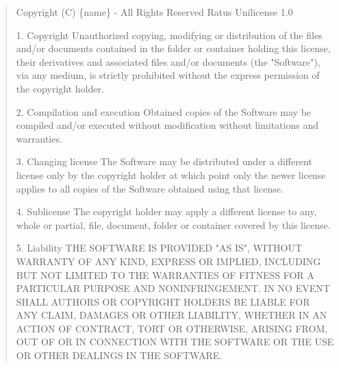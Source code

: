 \documentclass[a4paper,11pt]{article}
\begin{document}
  \begin{quote}
    Copyright (C) \{name\} - All Rights Reserved\newline
    Ratus Unilicense 1.0

    1. Copyright\newline
    Unauthorized copying, modifying or distribution of the files and/or
    documents contained in the folder or container holding this license,
    their derivatives and associated files and/or documents (the "Software"),
    via any medium, is strictly prohibited without the express permission of
    the copyright holder.

    2. Compilation and execution\newline
    Obtained copies of the Software may be compiled and/or executed without
    modification without limitations and warranties.

    3. Changing license\newline
    The Software may be distributed under a different license only by the
    copyright holder at which point only the newer license applies to all
    copies of the Software obtained using that license.

    4. Sublicense\newline
    The copyright holder may apply a different license to any, whole or
    partial, file, document, folder or container covered by this license.

    5. Liability\newline
    THE SOFTWARE IS PROVIDED "AS IS", WITHOUT WARRANTY OF ANY KIND, EXPRESS OR
    IMPLIED, INCLUDING BUT NOT LIMITED TO THE WARRANTIES OF FITNESS FOR A
    PARTICULAR PURPOSE AND NONINFRINGEMENT. IN NO EVENT SHALL AUTHORS OR
    COPYRIGHT HOLDERS BE LIABLE FOR ANY CLAIM, DAMAGES OR OTHER LIABILITY,
    WHETHER IN AN ACTION OF CONTRACT, TORT OR OTHERWISE, ARISING FROM, OUT OF
    OR IN CONNECTION WITH THE SOFTWARE OR THE USE OR OTHER DEALINGS IN THE
    SOFTWARE.

  \end{quote}


\end{document}
